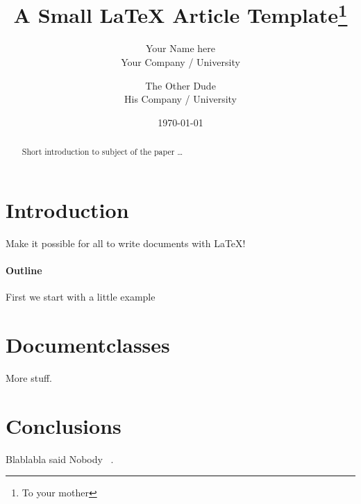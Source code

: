 \documentclass{article}
\title{A Small \LaTeX{} Article Template\thanks{To your mother}}
\author{Your Name here \\
	Your Company / University  \\
	\and 
	The Other Dude \\
	His Company / University \\
	}
\date{\today}
\begin{document}
\maketitle

\begin{abstract}
Short introduction to subject of the paper \ldots 
\end{abstract}

\section{Introduction}
Make it possible for all to write documents with \LaTeX{}!

\paragraph{Outline}
First we start with a little example

\section{Documentclasses} \label{documentclasses}
More stuff.

\section{Conclusions}\label{conclusions}
Blablabla said Nobody ~\cite{PAKEMAN2019127}.

{}

\end{document}
